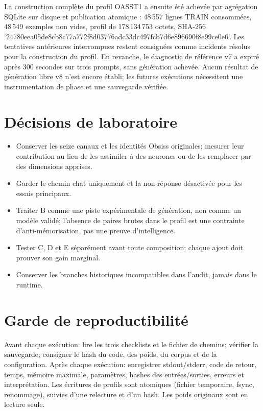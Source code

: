 \documentclass[11pt,a4paper]{report}
\begin{document}
La construction complète du profil OASST1 a ensuite été achevée par agrégation SQLite sur disque et publication atomique : 48\,557 lignes TRAIN consommées, 48\,549 exemples non vides, profil de 178\,134\,753 octets, SHA-256 `24780eea05de8cb8c77a772f8d03776adc33dc497fcb7d6e896690f8e99ce0e6`. Les tentatives antérieures interrompues restent consignées comme incidents résolus pour la construction du profil. En revanche, le diagnostic de référence v7 a expiré après 300 secondes sur trois prompts, sans génération achevée. Aucun résultat de génération libre v8 n'est encore établi; les futures exécutions nécessitent une instrumentation de phase et une sauvegarde vérifiée.

\chapter{Décisions de laboratoire}
\begin{itemize}
\item Conserver les seize canaux et les identités Obsiss originales; mesurer leur contribution au lieu de les assimiler à des neurones ou de les remplacer par des dimensions apprises.
\item Garder le chemin chat uniquement et la non-réponse désactivée pour les essais principaux.
\item Traiter B comme une piste expérimentale de génération, non comme un modèle validé; l'absence de paires brutes dans le profil est une contrainte d'anti-mémorisation, pas une preuve d'intelligence.
\item Tester C, D et E séparément avant toute composition; chaque ajout doit prouver son gain marginal.
\item Conserver les branches historiques incompatibles dans l'audit, jamais dans le runtime.
\end{itemize}

\chapter{Garde de reproductibilité}
Avant chaque exécution: lire les trois checklists et le fichier de chemins; vérifier la sauvegarde; consigner le hash du code, des poids, du corpus et de la configuration. Après chaque exécution: enregistrer stdout/stderr, code de retour, temps, mémoire maximale, paramètres, hashes des entrées/sorties, erreurs et interprétation. Les écritures de profils sont atomiques (fichier temporaire, fsync, renommage), suivies d'une relecture et d'un hash. Les poids originaux sont en lecture seule.
\end{document}
